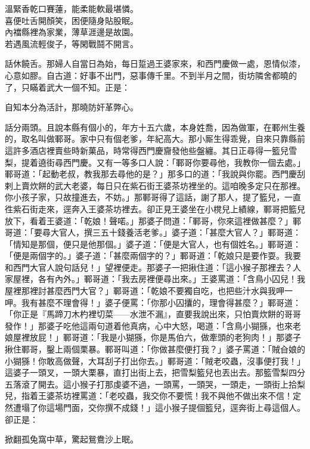 \begin{myquote} 
溫緊香乾口賽蓮，能柔能軟最堪憐。\\喜便吐舌開顏笑，困便隨身貼股眠。\\內襠縣裡為家業，薄草涯邊是故園。\\若遇風流輕俊子，等閑戰鬪不開言。
\end{myquote} 

話休饒舌。那婦人自當日為始，每日踅過王婆家來，和西門慶做一處，恩情似漆，心意如膠。自古道：好事不出門，惡事傳千里。不到半月之間，街坊隣舍都曉的了，只瞞着武大一個不知。正是：

\begin{myquote} 
自知本分為活計，那曉防奸革弊心。
\end{myquote} 

話分兩頭。且說本縣有個小的，年方十五六歲，本身姓喬，因為做軍，在鄆州生養的，取名叫做鄆哥。家中只有個老爹，年紀高大。那小厮生得乖覺，自來只靠縣前這許多酒店裡賣些時新菓品，時常得西門慶齎發他些盤纏。{}其日正尋得一籃兒雪梨，提着遶街尋西門慶。又有一等多口人說：「鄆哥你要尋他，我教你一個去處。」鄆哥道：「起動老叔，教我那去尋他的是？」那多口的道：「我說與你罷。西門慶刮剌上賣炊餅的武大老婆，每日只在紫石街王婆茶坊裡坐的。這咱晚多定只在那裡。你小孩子家，只故撞進去，不妨。」那鄆哥得了這話，謝了那人，提了籃兒，一直徃紫石街走來，逕奔入王婆茶坊裡去。卻正見王婆坐在小櫈兒上績線，鄆哥把籃兒放下，看着王婆道：「乾娘！聲喏。」那婆子問道：「鄆哥，你來這裡做甚麼？」鄆哥道：「要尋大官人，撰三五十錢養活老爹。」婆子道：「甚麼大官人？」鄆哥道：「情知是那個，便只是他那個。」{}婆子道：「便是大官人，也有個姓名。」鄆哥道：「便是兩個字的。」婆子道：「甚麼兩個字的？」鄆哥道：「乾娘只是要作耍。我要和西門大官人說句話兒！」望裡便走。那婆子一把揪住道：「這小猴子那裡去？人家屋裡，各有內外。」鄆哥道：「我去房裡便尋出來。」王婆罵道：「含鳥小囚兒！我屋裡那裡討甚麼西門大官？」鄆哥道：「乾娘不要獨自吃，也把些汁水與我呷一呷。{}我有甚麼不理會得！」婆子便罵：「你那小囚攮的，理會得甚麼？」鄆哥道：「你正是『馬蹄刀木杓裡切菜——水泄不漏』，直要我說出來，只怕賣炊餅的哥哥發作！」{}那婆子吃他這兩句道着他真病，心中大怒，喝道：「含鳥小猢猻，也來老娘屋裡放屁！」鄆哥道：「我是小猢猻，你是馬伯六，做牽頭的老狗肉！」{}那婆子揪住鄆哥，鑿上兩個栗暴。鄆哥叫道：「你做甚麼便打我？」婆子罵道：「賊㒲娘的小猢猻！你敢高做聲，大耳刮子打出你去。」鄆哥道：「賊老咬蟲，沒事便打我！」這婆子一頭叉，一頭大栗暴，直打出街上去，把雪梨籃兒也丟出去。那籃雪梨四分五落滾了開去。這小猴子打那虔婆不過，一頭罵，一頭哭，一頭走，一頭街上拾梨兒，{}指着王婆茶坊裡罵道：「老咬蟲，我交你不要慌！我不與他不做出來不信！定然遭塌了你這場門面，交你撰不成錢！」這小猴子提個籃兒，逕奔街上尋這個人。卻正是：

\begin{myquote} 
掀翻孤兔窩中草，驚起鴛鴦沙上眠。{}
\end{myquote} 

